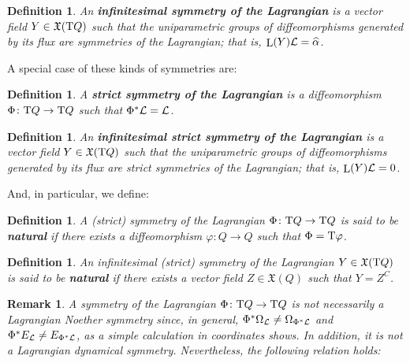 \documentclass[12pt]{report}
\newtheorem{definition}[teor]{Definition}
\newtheorem{remark}[teor]{Remark}
\def\vf{\mathfrak X}
\def\Lag{{\cal L}}
\def\Real{\mathbb{R}}
\def\Tan{{\rm T}}
\def\Lie{\mathop{\rm L}\nolimits}
\begin{document}
\begin{definition}
An \textbf{ infinitesimal symmetry of the Lagrangian} is
a vector field $Y\in\vf (\Tan Q)$ such that  the uniparametric groups of diffeomorphisms 
generated by its flux are symmetries of the Lagrangian; that is,
$\Lie(Y)\Lag=\widehat\alpha$.
\end{definition}

A special case of these kinds of symmetries are:

\begin{definition}
A \textbf{strict symmetry of the Lagrangian} is a diffeomorphism 
$\Phi\colon\Tan Q\to\Tan Q$ such that $\Phi^*\Lag=\Lag$.
\end{definition}

\begin{definition}
An \textbf{ infinitesimal strict symmetry of the Lagrangian} is
a vector field $Y\in\vf (\Tan Q)$ such that  the uniparametric groups of diffeomorphisms 
generated by its flux are strict symmetries of the Lagrangian; that is,
$\Lie(Y)\Lag=0$.
\end{definition}

And, in particular, we define:

\begin{definition}
A (strict) symmetry of the Lagrangian  $\Phi\colon\Tan Q\to\Tan Q$ is 
said to be \textbf{natural} if there exists a diffeomorphism $\varphi\colon Q\to Q$ such that 
$\Phi=\Tan\varphi$.
\end{definition}

\begin{definition}
An infinitesimal (strict) symmetry of the Lagrangian $Y\in\vf (\Tan Q)$ is 
said to be \textbf{natural} if there
exists a vector field $Z\in\vf (Q)$ such that $Y=Z^C$.
\end{definition}

\begin{remark}{\rm 
A symmetry of the Lagrangian $\Phi\colon\Tan Q\to\Tan Q$
is not necessarily a Lagrangian Noether  symmetry since, in general, 
$\Phi^*\Omega_\Lag\not=\Omega_{\Phi^*\Lag}$ and
$\Phi^* E_\Lag\not= E_{\Phi^*\Lag}$,
as a simple calculation in coordinates shows.
In addition, it is not a Lagrangian dynamical symmetry.
Nevertheless, the following relation holds:
}\end{remark}
\end{document}
